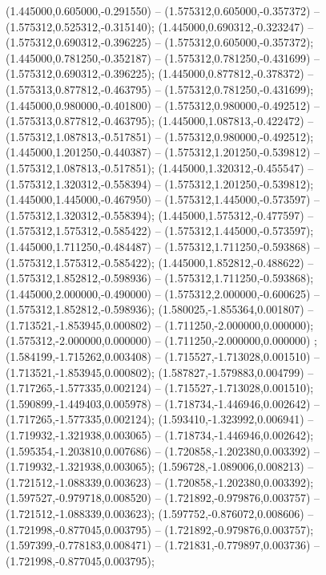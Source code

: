  (1.445000,0.605000,-0.291550) -- (1.575312,0.605000,-0.357372) -- (1.575312,0.525312,-0.315140);
 (1.445000,0.690312,-0.323247) -- (1.575312,0.690312,-0.396225) -- (1.575312,0.605000,-0.357372);
 (1.445000,0.781250,-0.352187) -- (1.575312,0.781250,-0.431699) -- (1.575312,0.690312,-0.396225);
 (1.445000,0.877812,-0.378372) -- (1.575313,0.877812,-0.463795) -- (1.575312,0.781250,-0.431699);
 (1.445000,0.980000,-0.401800) -- (1.575312,0.980000,-0.492512) -- (1.575313,0.877812,-0.463795);
 (1.445000,1.087813,-0.422472) -- (1.575312,1.087813,-0.517851) -- (1.575312,0.980000,-0.492512);
 (1.445000,1.201250,-0.440387) -- (1.575312,1.201250,-0.539812) -- (1.575312,1.087813,-0.517851);
 (1.445000,1.320312,-0.455547) -- (1.575312,1.320312,-0.558394) -- (1.575312,1.201250,-0.539812);
 (1.445000,1.445000,-0.467950) -- (1.575312,1.445000,-0.573597) -- (1.575312,1.320312,-0.558394);
 (1.445000,1.575312,-0.477597) -- (1.575312,1.575312,-0.585422) -- (1.575312,1.445000,-0.573597);
 (1.445000,1.711250,-0.484487) -- (1.575312,1.711250,-0.593868) -- (1.575312,1.575312,-0.585422);
 (1.445000,1.852812,-0.488622) -- (1.575312,1.852812,-0.598936) -- (1.575312,1.711250,-0.593868);
 (1.445000,2.000000,-0.490000) -- (1.575312,2.000000,-0.600625) -- (1.575312,1.852812,-0.598936);
 (1.580025,-1.855364,0.001807) -- (1.713521,-1.853945,0.000802) -- (1.711250,-2.000000,0.000000);
 (1.575312,-2.000000,0.000000) -- (1.711250,-2.000000,0.000000) ;
 (1.584199,-1.715262,0.003408) -- (1.715527,-1.713028,0.001510) -- (1.713521,-1.853945,0.000802);
 (1.587827,-1.579883,0.004799) -- (1.717265,-1.577335,0.002124) -- (1.715527,-1.713028,0.001510);
 (1.590899,-1.449403,0.005978) -- (1.718734,-1.446946,0.002642) -- (1.717265,-1.577335,0.002124);
 (1.593410,-1.323992,0.006941) -- (1.719932,-1.321938,0.003065) -- (1.718734,-1.446946,0.002642);
 (1.595354,-1.203810,0.007686) -- (1.720858,-1.202380,0.003392) -- (1.719932,-1.321938,0.003065);
 (1.596728,-1.089006,0.008213) -- (1.721512,-1.088339,0.003623) -- (1.720858,-1.202380,0.003392);
 (1.597527,-0.979718,0.008520) -- (1.721892,-0.979876,0.003757) -- (1.721512,-1.088339,0.003623);
 (1.597752,-0.876072,0.008606) -- (1.721998,-0.877045,0.003795) -- (1.721892,-0.979876,0.003757);
 (1.597399,-0.778183,0.008471) -- (1.721831,-0.779897,0.003736) -- (1.721998,-0.877045,0.003795);
